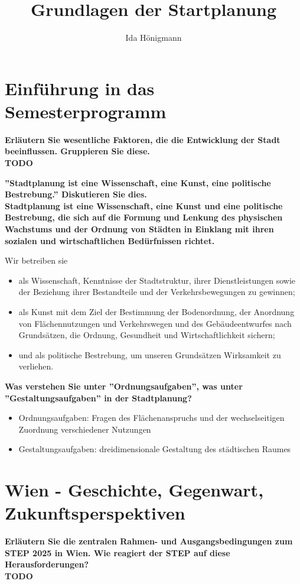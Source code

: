 \documentclass[]{article}
\title{Grundlagen der Startplanung}
\author{Ida Hönigmann}
\newenvironment{question}{\vspace{8mm}\noindent\bfseries}{\\}
\begin{document}
\maketitle

\section{Einführung in das Semesterprogramm}
\begin{question}
	Erläutern Sie wesentliche Faktoren, die die Entwicklung der Stadt beeinflussen. Gruppieren Sie diese.
\end{question}
TODO

\begin{question}
	''Stadtplanung ist eine Wissenschaft, eine Kunst, eine politische Bestrebung.'' Diskutieren Sie dies.
\end{question}
Stadtplanung ist eine Wissenschaft, eine Kunst und eine politische Bestrebung, die sich auf die Formung und Lenkung des physischen Wachstums und der Ordnung von Städten in Einklang mit ihren sozialen und wirtschaftlichen Bedürfnissen richtet.

Wir betreiben sie
\begin{itemize}
	\item als Wissenschaft, Kenntnisse der Stadtstruktur, ihrer Dienstleistungen sowie der Beziehung ihrer Bestandteile und der Verkehrsbewegungen zu gewinnen;
	\item als Kunst mit dem Ziel der Bestimmung der Bodenordnung, der Anordnung von Flächennutzungen und Verkehrswegen und des Gebäudeentwurfes nach Grundsätzen, die Ordnung, Gesundheit und Wirtschaftlichkeit sichern;
	\item und als politische Bestrebung, um unseren Grundsätzen Wirksamkeit zu verliehen.
\end{itemize}

\begin{question}
	Was verstehen Sie unter ''Ordnungsaufgaben'', was unter ''Gestaltungsaufgaben'' in der Stadtplanung?
\end{question}
\begin{itemize}
	\item Ordnungsaufgaben: Fragen des Flächenanspruchs und der wechselseitigen Zuordnung verschiedener Nutzungen
	\item Gestaltungsaufgaben: dreidimensionale Gestaltung des städtischen Raumes
\end{itemize}

\section{Wien - Geschichte, Gegenwart, Zukunftsperspektiven}
\begin{question}
	Erläutern Sie die zentralen Rahmen- und Ausgangsbedingungen zum STEP 2025 in Wien. Wie reagiert der STEP auf diese Herausforderungen?
\end{question}
TODO
\end{document}
